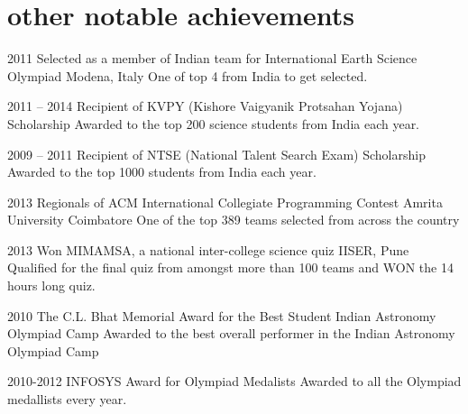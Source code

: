 \documentclass[11pt]{friggeri-cv}
\begin{document}
\section{other notable achievements}

\begin{entrylist}
  \entryy
    {2011}
    {Selected as a member of Indian team for International Earth Science Olympiad}
    {Modena, Italy}
    {One of top 4 from India to get selected.}
\end{entrylist}


\begin{entrylist}
  \entryy
    {2011 -- 2014}
    {Recipient of KVPY (Kishore Vaigyanik Protsahan Yojana) Scholarship}{}
    {Awarded to the top 200 science students from India each year.}

\end{entrylist}


\begin{entrylist}
  \entryy
    {2009 -- 2011}
    {Recipient of NTSE (National Talent Search Exam) Scholarship}{}
    {Awarded to the top 1000 students from India each year.}
\end{entrylist}


\begin{entrylist}
  \entryy
    {2013}
    {Regionals of ACM International Collegiate Programming Contest}
    {Amrita University Coimbatore}
    {One of the top 389 teams selected from across the country}
\end{entrylist}


\begin{entrylist}
  \entryy
    {2013}
    {Won MIMAMSA, a national inter-college science quiz}
    {IISER, Pune}
    {Qualified for the final quiz from amongst more than 100 teams and WON the 14 hours long quiz.}
\end{entrylist}


\begin{entrylist}
  \entryy
    {2010}
    {The C.L. Bhat Memorial Award for the Best Student}
    {Indian Astronomy Olympiad Camp}
    {Awarded to the best overall performer in the Indian Astronomy Olympiad Camp}

\end{entrylist}

\begin{entrylist}
  \entryy
    {2010-2012}
    {INFOSYS Award for Olympiad Medalists}
    {}
    {Awarded to all the Olympiad medallists every year.}
\end{entrylist}
\end{document}
